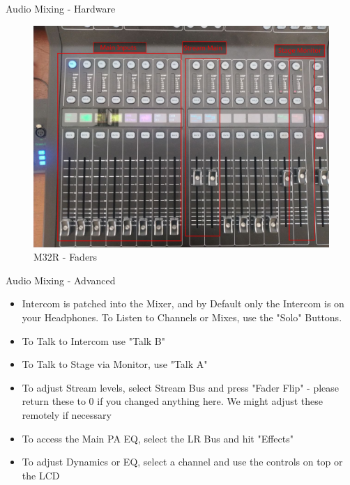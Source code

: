 \documentclass[aspectratio=169]{beamer}
\begin{document}
\begin{frame}{Audio Mixing - Hardware}
	\begin{figure} 
		\centering
		\includegraphics[width=.9\textwidth]{images/m32_faders.png}
		\caption{M32R - Faders}
	\end{figure}
\end{frame}

\begin{frame}{Audio Mixing - Advanced}
	\begin{itemize}
		\item Intercom is patched into the Mixer, and by Default only the Intercom is on your Headphones. To Listen to Channels or Mixes, use the "Solo" Buttons.
		\item To Talk to Intercom use "Talk B"
		\item To Talk to Stage via Monitor, use "Talk A"
		\item To adjust Stream levels, select Stream Bus and press "Fader Flip" - please return these to 0 if you changed anything here. We might adjust these remotely if necessary
		\item To access the Main PA EQ, select the LR Bus and hit "Effects"
		\item To adjust Dynamics or EQ, select a channel and use the controls on top or the LCD
	\end{itemize}
\end{frame}
\end{document}
